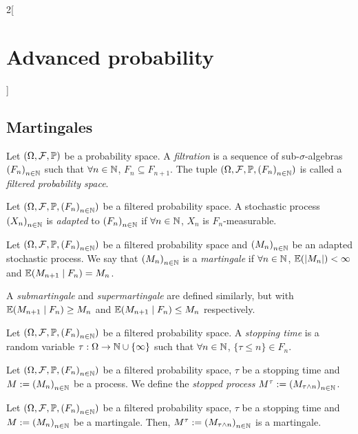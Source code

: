 \documentclass[../../../main_math.tex]{subfiles}
\begin{document}
\begin{multicols}{2}[\section{Advanced probability}]
  \subsection{Martingales}
  \begin{definition}
    Let $(\Omega,\mathcal{F},\mathbb{P})$ be a probability space. A \emph{filtration} is a sequence of sub-$\sigma$-algebras ${(F_n)}_{n\in\mathbb{N}}$ such that $\forall n\in\mathbb{N}$, $F_n\subseteq F_{n+1}$. The tuple $(\Omega,\mathcal{F},\mathbb{P},{(F_n)}_{n\in\mathbb{N}})$ is called a \emph{filtered probability space}.
  \end{definition}
  \begin{definition}
    Let $(\Omega,\mathcal{F},\mathbb{P},{(F_n)}_{n\in\mathbb{N}})$ be a filtered probability space. A stochastic process ${(X_n)}_{n\in\mathbb{N}}$ is \emph{adapted} to ${(F_n)}_{n\in\mathbb{N}}$ if $\forall n\in\mathbb{N}$, $X_n$ is $F_n$-measurable.
  \end{definition}
  \begin{definition}
    Let $(\Omega,\mathcal{F},\mathbb{P},{(F_n)}_{n\in\mathbb{N}})$ be a filtered probability space and ${(M_n)}_{n\in\mathbb{N}}$ be an adapted stochastic process. We say that ${(M_n)}_{n\in\mathbb{N}}$ is a \emph{martingale} if $\forall n\in\mathbb{N}$, $\mathbb{E}(\abs{M_n})<\infty$ and $\mathbb{E}(M_{n+1}\mid F_n)=M_n$.
  \end{definition}
  \begin{remark}
    A \emph{submartingale} and \emph{supermartingale} are defined similarly, but with $\mathbb{E}(M_{n+1}\mid F_n)\geq M_n$ and $\mathbb{E}(M_{n+1}\mid F_n)\leq M_n$ respectively.
  \end{remark}
  \begin{definition}
    Let $(\Omega,\mathcal{F},\mathbb{P},{(F_n)}_{n\in\mathbb{N}})$ be a filtered probability space. A \emph{stopping time} is a random variable $\tau:\Omega\to \mathbb{N}\cup\{\infty\}$ such that $\forall n\in\mathbb{N}$, $\{\tau\leq n\}\in F_n$.
  \end{definition}
  \begin{definition}
    Let $(\Omega,\mathcal{F},\mathbb{P},{(F_n)}_{n\in\mathbb{N}})$ be a filtered probability space, $\tau$ be a stopping time and $M:={(M_n)}_{n\in\mathbb{N}}$ be a process. We define the \emph{stopped process} $M^\tau:={(M_{\tau\wedge n})}_{n\in\mathbb{N}}$.
  \end{definition}
  \begin{proposition}
    Let $(\Omega,\mathcal{F},\mathbb{P},{(F_n)}_{n\in\mathbb{N}})$ be a filtered probability space, $\tau$ be a stopping time and $M:={(M_n)}_{n\in\mathbb{N}}$ be a martingale. Then, $M^\tau:={(M_{\tau\wedge n})}_{n\in\mathbb{N}}$ is a martingale.

\end{proposition}
\end{multicols}
\end{document}
